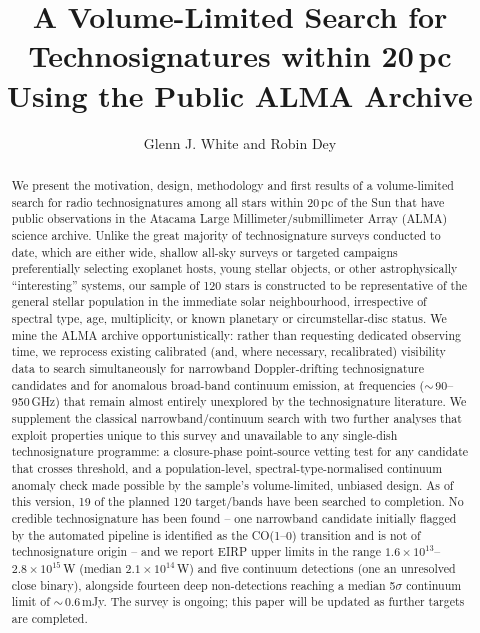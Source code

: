 \documentclass{openjournal}
\begin{document}
\title{A Volume-Limited Search for Technosignatures within 20\,pc Using the Public ALMA Archive}

\author{Glenn J. White and Robin Dey}

\begin{abstract}
We present the motivation, design, methodology and first results of a
volume-limited search for radio technosignatures among all stars within
20\,pc of the Sun that have public observations in the Atacama Large
Millimeter/submillimeter Array (ALMA) science archive. Unlike the great
majority of technosignature surveys conducted to date, which are either
wide, shallow all-sky surveys or targeted campaigns preferentially
selecting exoplanet hosts, young stellar objects, or other astrophysically
``interesting'' systems, our sample of 120 stars is constructed to be
representative of the general stellar population in the immediate solar
neighbourhood, irrespective of spectral type, age, multiplicity, or known
planetary or circumstellar-disc status. We mine the ALMA archive
opportunistically: rather than requesting dedicated observing time, we
reprocess existing calibrated (and, where necessary, recalibrated)
visibility data to search simultaneously for narrowband Doppler-drifting
technosignature candidates and for anomalous broad-band continuum
emission, at frequencies ($\sim$\,90--950\,GHz) that remain almost
entirely unexplored by the technosignature literature. We supplement the
classical narrowband/continuum search with two further analyses that
exploit properties unique to this survey and unavailable to any
single-dish technosignature programme: a closure-phase point-source
vetting test for any candidate that crosses threshold, and a
population-level, spectral-type-normalised continuum anomaly check made
possible by the sample's volume-limited, unbiased design. As of this
version, 19 of the planned 120 target/bands have been searched to
completion. No credible technosignature has been found -- one narrowband
candidate initially flagged by the automated pipeline is identified as
the CO(1--0) transition and is not of technosignature origin -- and we
report EIRP upper limits in the range $1.6\times10^{13}$--$2.8\times10^{15}$\,W
(median $2.1\times10^{14}$\,W) and five continuum detections (one an
unresolved close binary), alongside fourteen deep non-detections
reaching a median 5$\sigma$ continuum limit of $\sim$\,0.6\,mJy. The
survey is ongoing; this paper will be updated as further targets are
completed.
\end{abstract}
\end{document}
